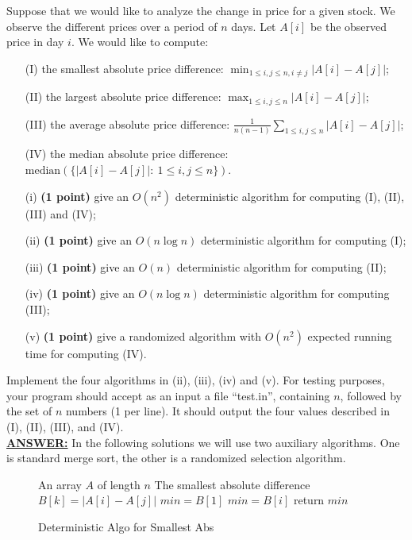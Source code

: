 \documentclass{article}
\begin{document}
Suppose that we would like to analyze the change in price for a given
stock. We observe the different prices over a period of $n$ days. Let
$A[i]$ be the observed price in day $i$. We would like to compute: 
\begin{enumerate}
\item[(I)]  the smallest absolute price difference: $\min_{1\le i,j\le
    n,i\ne j}|A[i]-A[j]|$;  
\item[(II)] the largest absolute price difference: $\max_{1\le i,j\le
    n}|A[i]-A[j]|$;  
\item[(III)]  the average absolute price difference:
  $\frac{1}{n(n-1)}\sum_{1\le i,j\le n}|A[i]-A[j]|$;  
\item[(IV)]  the median absolute price difference:
  $\text{median}(\{|A[i]-A[j]|:~1\le i,j\le n\})$.  
\end{enumerate}
\begin{enumerate}
\item[(i)] \textbf{(1 point)} give an $O(n^2)$ deterministic algorithm
  for computing (I), (II), (III) and (IV); 
\item[(ii)] \textbf{(1 point)} give an $O(n\log n)$ deterministic
  algorithm for computing (I);  
\item[(iii)] \textbf{(1 point)} give an $O(n)$ deterministic algorithm
  for computing (II);  
\item[(iv)] \textbf{(1 point)} give an $O(n\log n)$ deterministic
  algorithm for computing (III);  
\item[(v)] \textbf{(1 point)}  give a randomized algorithm with
  $O(n^2)$ expected running time for computing (IV). 
\end{enumerate}
Implement the four algorithms in (ii), (iii), (iv) and (v). For
testing purposes, your program  should accept as an input a file
``test.in'', containing $n$, followed by the set of $n$ numbers (1 per
line). It should output the four values described in (I), (II), (III),
and (IV).\\
\noindent \underline{\textbf{ANSWER:}}
In the following solutions we will use two auxiliary algorithms. One
is standard merge sort, the other is a randomized selection algorithm.
\par
\begin{figure*}[!htbp]
  \centering
  \begin{algorithmic}
    \REQUIRE An array $A$ of length $n$
    \ENSURE The smallest absolute difference
		\STATE $B[k] = |A[i] - A[j]|$
	\ENDFOR
    \ENDFOR
    \STATE $min = B[1]$
		\STATE $min = B[i]$
	\ENDIF
    \ENDFOR
    \STATE return $min$

  \end{algorithmic}
  \caption{Deterministic Algo for Smallest Abs}
  \label{fig:deter-smallest}
\end{figure*}
\end{document}
